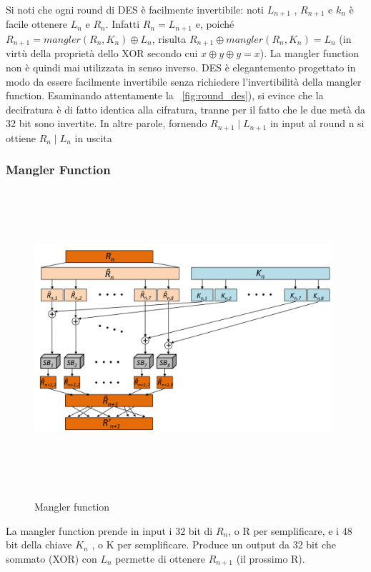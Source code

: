Si noti che ogni round di DES è facilmente invertibile: noti $L_{n+1}$ , $R_{n+1}$ e $k_{n}$ è facile ottenere $L_{n}$ e $R_{n}$. Infatti $R_{n} = L_{n+1}$ e, poiché $R_{n+1} = mangler(R_{n}, K_{n}) \oplus L_{n}$, risulta $R_{n+1} \oplus mangler(R_{n}, K_{n}) = L_{n}$ (in virtù della proprietà dello XOR secondo cui $x \oplus y \oplus y = x$). La mangler function non è quindi mai utilizzata in senso inverso. DES è elegantemento progettato in modo da essere facilmente invertibile senza richiedere l'invertibilità della mangler function. Esaminando attentamente la \figurename ~\ref{fig:round_des}), si evince che la decifratura è di fatto identica alla cifratura, tranne per il fatto che le due metà da 32 bit sono invertite. In altre parole, fornendo $R_{n+1} \mid L_{n+1}$ in input al round n si ottiene $R_{n} \mid L_{n}$ in uscita
\subsubsection{Mangler Function}
\begin{figure}[htbp]
	\centering%
	\subfigure%
	{\includegraphics[height=11cm, width=11cm, keepaspectratio]{Immagini/chiave_segreta/mangler.png}}
	\caption{Mangler function \label{fig:mangler}} 	
\end{figure}
La mangler function prende in input i 32 bit di $R_{n}$, o R per semplificare, e i 48 bit della chiave $K_{n}$ , o K per semplificare. Produce un output da 32 bit che sommato (XOR) con $L_{n}$ permette di ottenere $R_{n+1}$ (il prossimo R).\newline
